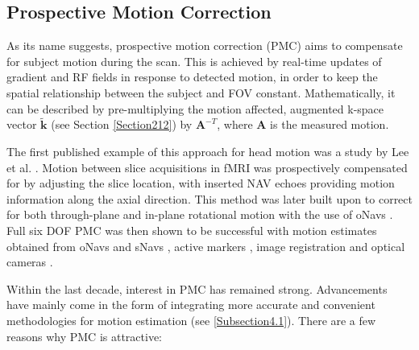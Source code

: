 \documentclass[class=article, crop=false]{standalone}
\begin{document}
\subsection{Prospective Motion Correction}
As its name suggests, prospective motion correction (PMC) aims to compensate for subject motion during the scan. This is achieved by real-time updates of gradient and RF fields in response to detected motion, in order to keep the spatial relationship between the subject and FOV constant. Mathematically, it can be described by pre-multiplying the motion affected, augmented k-space vector $\tilde{\textbf{k}}$ (see Section \ref{Section212}) by $\textbf{A}^{-T}$, where \textbf{A} is the measured motion. 
\par
The first published example of this approach for head motion was a study by Lee et al. \parencite*{Lee1996}. Motion between slice acquisitions in fMRI was prospectively compensated for by adjusting the slice location, with inserted NAV echoes providing motion information along the axial direction. This method was later built upon to correct for both through-plane and in-plane rotational motion with the use of oNavs \parencite{Lee1998}. Full six DOF PMC was then shown to be successful with motion estimates obtained from oNavs \parencite{Ward2000} and sNavs \parencite{Welch2001}, active markers \parencite{Derbyshire1998}, image registration \parencite{Thesen2000} and optical cameras \parencite{Zaitsev2006a}.
\par
Within the last decade, interest in PMC has remained strong. Advancements have mainly come in the form of integrating more accurate and convenient methodologies for motion estimation (see \ref{Subsection4.1}). There are a few reasons why PMC is attractive:
\end{document}
